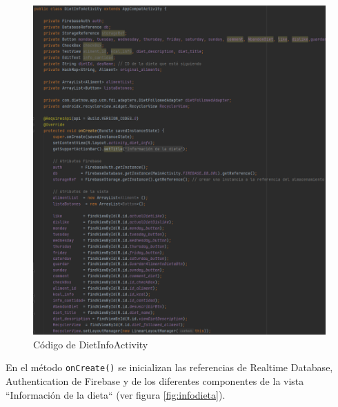 \begin{figure}[H]
    \centering
    \includegraphics[width=\textwidth]{Images/Capitulo7/dietinfo.png}
        \caption{Código de DietInfoActivity}
    \label{fig:dietinfo}
\end{figure}

En el método \texttt{onCreate()} se inicializan las referencias de Realtime Database, Authentication de Firebase y de los diferentes componentes de la vista ``Información de la dieta`` (ver figura \ref{fig:infodieta}).

